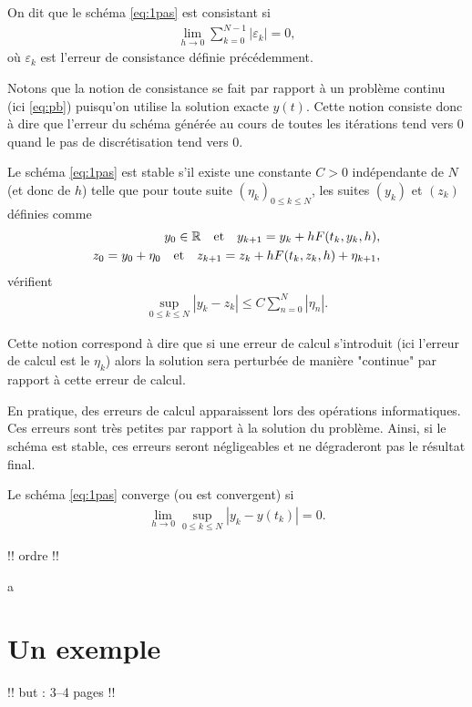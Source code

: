 \documentclass[12pt,a4paper,twoside]{article}
\begin{document}
\begin{definition}[Consistance]
  On dit que le sch\'ema \eqref{eq:1pas} est consistant si 
  \begin{align*}
    \lim_{h \to 0} \sum_{k=0}^{N-1} | \varepsilon_k | = 0 ,
  \end{align*}
  o\`u $\varepsilon_k$ est l'erreur de consistance d\'efinie pr\'ec\'edemment.
\end{definition}
Notons que la notion de consistance se fait par rapport \`a un probl\`eme continu
(ici \eqref{eq:pb}) puisqu'on utilise la solution exacte $y(t)$.
Cette notion consiste donc \`a dire que l'erreur du sch\'ema g\'en\'er\'ee
au cours de toutes les it\'erations tend vers 0 quand le pas de discr\'etisation
tend vers 0.

\begin{definition}[Stabilit\'e]
  Le sch\'ema \eqref{eq:1pas} est stable s'il existe une constante $C > 0$
  ind\'ependante de $N$ (et donc de $h$) telle que pour toute suite 
  $(\eta_k)_{0 \leq k \leq N}$, les suites $(y_k)$ et $(z_k)$ d\'efinies comme
  \begin{align*}
    y_0 \in \mathbb{R} \quad \text{et} \quad y_{k+1} = y_k + h F(t_k,y_k,h) ,
    \\
    z_0 = y_0 + \eta_0 \quad \text{et} \quad z_{k+1} = z_k + h F(t_k,z_k,h) + \eta_{k+1} ,
  \end{align*}
  v\'erifient
  \begin{align*}
    \sup_{0 \leq k \leq N} | y_k - z_k | \leq C \sum_{n=0}^N | \eta_n | .
  \end{align*}
\end{definition}

Cette notion correspond \`a dire que si une erreur de calcul s'introduit
(ici l'erreur de calcul est le $\eta_k$) alors la solution sera perturb\'ee
de mani\`ere "continue" par rapport \`a cette erreur de calcul.

En pratique, des erreurs de calcul apparaissent lors des op\'erations informatiques.
Ces erreurs sont tr\`es petites par rapport \`a la solution du probl\`eme.
Ainsi, si le sch\'ema est stable, ces erreurs seront n\'egligeables et ne d\'egraderont
pas le r\'esultat final.


\begin{definition}[Convergence]
  Le sch\'ema \eqref{eq:1pas} converge (ou est convergent) si
  \begin{align*}
    \lim_{h \to 0} \sup_{0 \leq k \leq N} | y_k - y(t_k) | = 0 .
  \end{align*}
\end{definition}

!! ordre !!

\begin{theorem}[...]
  a
\end{theorem}


\section{Un exemple}

!! but : 3--4 pages !!

\end{document}
